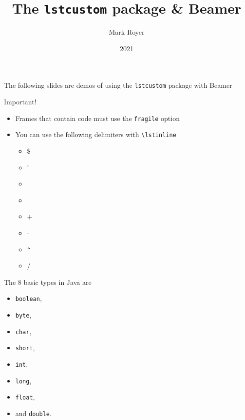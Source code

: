 \documentclass{beamer}
\title{The \texttt{lstcustom} package \& Beamer}
\author{Mark Royer}
\date{2021}
\begin{document}
\frame{\titlepage}

\begin{frame}[fragile]

  The following slides are demos of using the \texttt{lstcustom}
  package with Beamer

  \begin{alertblock}{Important!}
    \begin{itemize}
    \item Frames that contain code must use the \texttt{fragile}
      option
    \item You can use the following delimiters with
      \texttt{\textbackslash lstinline}
      \begin{itemize}
      \item \$
      \item !
      \item |
      \item \texttildelow
      \item +
      \item -
      \item \verb=^=
      \item /
      \end{itemize}
    \end{itemize}

  \end{alertblock}
  
\end{frame}


\begin{frame}[fragile]

  The 8 basic types in Java are
  \begin{itemize}
  \item \lstinline$boolean$,
  \item \lstinline!byte!,
  \item \lstinline|char|,
  \item \lstinline~short~,
  \item \lstinline+int+,
  \item \lstinline-long-,
  \item \lstinline^float^,
  \item and \lstinline/double/.
  \end{itemize}

\end{frame}
\end{document}
